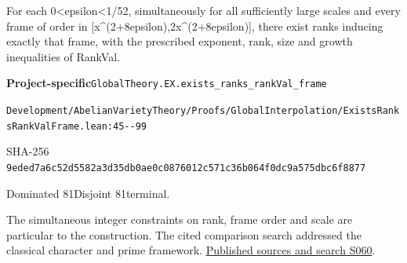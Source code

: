 
\begin{formalstatement}[D513]\label{decomp:D513}
For each 0<epsilon<1/52, simultaneously for all sufficiently large scales and every frame of order in [x\textasciicircum{}(2+8epsilon),2x\textasciicircum{}(2+8epsilon)], there exist ranks inducing exactly that frame, with the prescribed exponent, rank, size and growth inequalities of RankVal.
\end{formalstatement}
{\small\raggedright\noindent\textsf{\bfseries Project-specific}\quad \nolinkurl{GlobalTheory.EX.exists_ranks_rankVal_frame}\par\noindent \nolinkurl{Development/AbelianVarietyTheory/Proofs/GlobalInterpolation/ExistsRanksRankValFrame.lean:45--99}\par\noindent SHA-256 \nolinkurl{9eded7a6c52d5582a3d35db0ae0c0876012c571c36b064f0dc9a575dbc6f8877}\par\noindent Dominated 81\quad Disjoint 81\quad terminal.\par}
The simultaneous integer constraints on rank, frame order and scale are particular to the construction. The cited comparison search addressed the classical character and prime framework.
\hyperref[lit:S060]{Published sources and search S060}.
